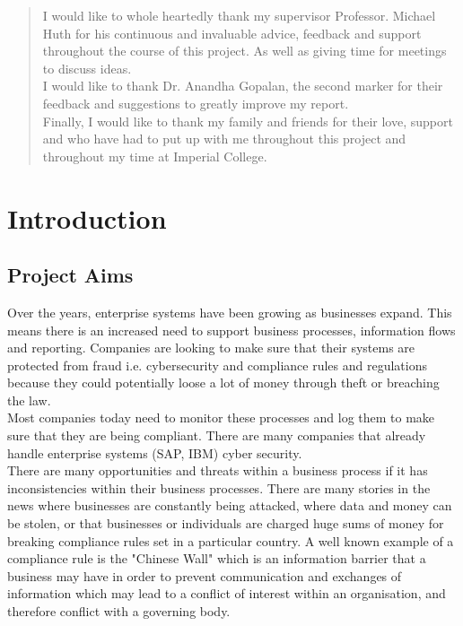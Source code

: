 \documentclass[a4paper]{report}
\begin{document}
\renewcommand{\abstractname}{Acknowledgements}
\begin{abstract}
I would like to whole heartedly thank my supervisor Professor. Michael Huth for his continuous and invaluable advice, feedback and support throughout the course of this project. As well as giving time for meetings to discuss ideas. \\

I would like to thank Dr. Anandha Gopalan, the second marker for their feedback and suggestions to greatly improve my report. \\

Finally, I would like to thank my family and friends for their love, support and who have had to put up with me throughout this project and throughout my time at Imperial College.  
\end{abstract}

\tableofcontents

\chapter{Introduction}
\section{Project Aims}
Over the years, enterprise systems have been growing as businesses expand. This means there is an increased need to support business processes, information flows and reporting. Companies are looking to make sure that their systems are protected from fraud i.e. cybersecurity and compliance rules and regulations because they could potentially loose a lot of money through theft or breaching the law. \\

Most companies today need to monitor these processes and log them to make sure that they are being compliant. There are many companies that already handle enterprise systems (SAP, IBM) cyber security. \\

There are many opportunities and threats within a business process if it has inconsistencies within their business processes. There are many stories in the news where businesses are constantly being attacked, where data and money can be stolen, or that businesses or individuals are charged huge sums of money for breaking compliance rules set in a particular country. A well known example of a compliance rule is the "Chinese Wall"\cite{ChineseWall} which is an information barrier that a business may have in order to prevent communication and exchanges of information which may lead to a conflict of interest within an organisation, and therefore conflict with a governing body.\\
\end{document}
